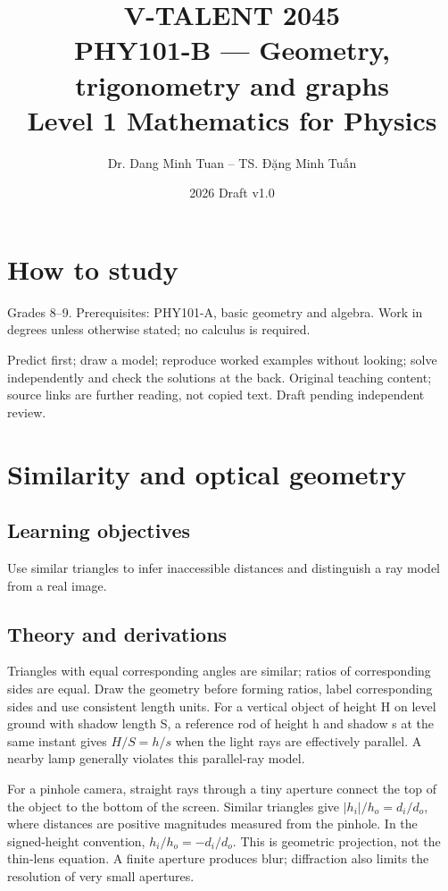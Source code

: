 \documentclass[11pt,a4paper,openany]{book}
\begin{document}
\title{V-TALENT 2045\\ PHY101-B --- Geometry, trigonometry and graphs\\\large Level 1 \textbar{} Mathematics for Physics}
\author{Dr. Dang Minh Tuan -- TS. Đặng Minh Tuấn}
\date{2026 \textbar{} Draft v1.0}
\maketitle
\tableofcontents
\chapter*{How to study}
Grades 8–9. Prerequisites: PHY101-A, basic geometry and algebra. Work in degrees unless otherwise stated; no calculus is required.

Predict first; draw a model; reproduce worked examples without looking; solve independently and check the solutions at the back. Original teaching content; source links are further reading, not copied text. Draft pending independent review.
\chapter{Similarity and optical geometry}
\section{Learning objectives}
Use similar triangles to infer inaccessible distances and distinguish a ray model from a real image.
\section{Theory and derivations}
Triangles with equal corresponding angles are similar; ratios of corresponding sides are equal. Draw the geometry before forming ratios, label corresponding sides and use consistent length units. For a vertical object of height H on level ground with shadow length S, a reference rod of height h and shadow s at the same instant gives $H/S=h/s$ when the light rays are effectively parallel. A nearby lamp generally violates this parallel-ray model.

For a pinhole camera, straight rays through a tiny aperture connect the top of the object to the bottom of the screen. Similar triangles give $|h_i|/h_o=d_i/d_o$, where distances are positive magnitudes measured from the pinhole. In the signed-height convention, $h_i/h_o=-d_i/d_o$. This is geometric projection, not the thin-lens equation. A finite aperture produces blur; diffraction also limits the resolution of very small apertures.
\end{document}
